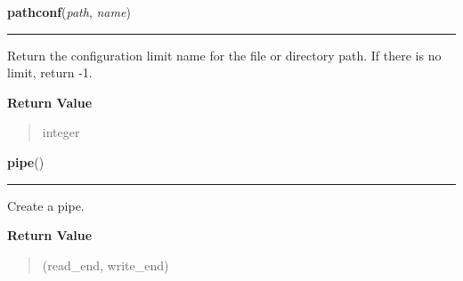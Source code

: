 \hspace{.8\funcindent}\begin{boxedminipage}{\funcwidth}

    \raggedright \textbf{pathconf}(\textit{path}, \textit{name})

    \vspace{-1.5ex}

    \rule{\textwidth}{0.5\fboxrule}
\setlength{\parskip}{2ex}
    Return the configuration limit name for the file or directory path. If 
    there is no limit, return -1.

\setlength{\parskip}{1ex}
      \textbf{Return Value}
    \vspace{-1ex}

      \begin{quote}
      integer

      \end{quote}

    \end{boxedminipage}

    \label{os:pipe}

    \vspace{0.5ex}

\hspace{.8\funcindent}\begin{boxedminipage}{\funcwidth}

    \raggedright \textbf{pipe}()

    \vspace{-1.5ex}

    \rule{\textwidth}{0.5\fboxrule}
\setlength{\parskip}{2ex}
    Create a pipe.

\setlength{\parskip}{1ex}
      \textbf{Return Value}
    \vspace{-1ex}

      \begin{quote}
      (read\_end, write\_end)

      \end{quote}

    \end{boxedminipage}

    \label{os:popen}

    \vspace{0.5ex}

